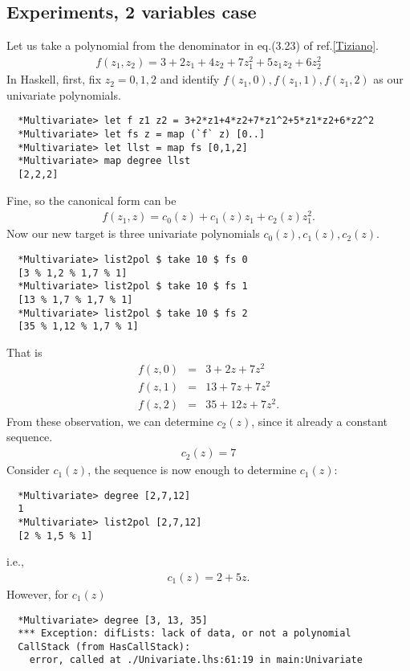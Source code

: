 \documentclass[11pt]{book}
\begin{document}
\subsection{Experiments, 2 variables case}
Let us take a polynomial from the denominator in eq.(3.23) of ref.\ref{Tiziano}.
\begin{eqnarray}
f(z_1,z_2) = 3 + 2z_1 + 4z_2 + 7z_1^2 + 5z_1z_2 + 6z_2^2
\end{eqnarray}
In Haskell, first, fix $z_2=0,1,2$ and identify $f(z_1, 0), f(z_1,1), f(z_1,2)$ as our univariate polynomials.
\begin{verbatim}
  *Multivariate> let f z1 z2 = 3+2*z1+4*z2+7*z1^2+5*z1*z2+6*z2^2
  *Multivariate> let fs z = map (`f` z) [0..]
  *Multivariate> let llst = map fs [0,1,2]
  *Multivariate> map degree llst
  [2,2,2]
\end{verbatim}
Fine, so the canonical form can be
\begin{eqnarray}
f(z_1, z) = c_0(z) + c_1(z)z_1 + c_2(z) z_1^2.
\end{eqnarray}
Now our new target is three univariate polynomials $c_0(z), c_1(z), c_2(z)$.
\begin{verbatim}
  *Multivariate> list2pol $ take 10 $ fs 0
  [3 % 1,2 % 1,7 % 1]
  *Multivariate> list2pol $ take 10 $ fs 1
  [13 % 1,7 % 1,7 % 1]
  *Multivariate> list2pol $ take 10 $ fs 2
  [35 % 1,12 % 1,7 % 1]
\end{verbatim}
That is
\begin{eqnarray}
f(z,0) &=& 3+ 2z+7z^2 \\
f(z,1) &=& 13 + 7z + 7z^2 \\
f(z,2) &=& 35 + 12z + 7z^2.
\end{eqnarray}
From these observation, we can determine $c_2(z)$, since it already a constant sequence.
\begin{eqnarray}
c_2(z) = 7
\end{eqnarray}
Consider $c_1(z)$, the sequence is now enough to determine $c_1(z)$:
\begin{verbatim}
  *Multivariate> degree [2,7,12]
  1
  *Multivariate> list2pol [2,7,12]
  [2 % 1,5 % 1]
\end{verbatim}
i.e.,
\begin{eqnarray}
c_1(z) = 2 + 5z.
\end{eqnarray}
However, for $c_1(z)$
\begin{verbatim}
  *Multivariate> degree [3, 13, 35]
  *** Exception: difLists: lack of data, or not a polynomial
  CallStack (from HasCallStack):
    error, called at ./Univariate.lhs:61:19 in main:Univariate
\end{verbatim}
\end{document}
